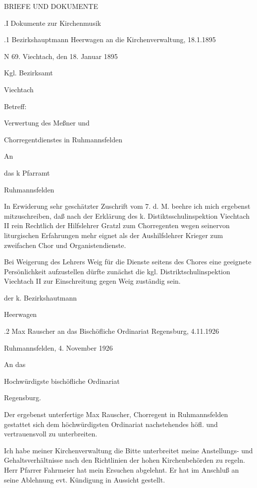 \documentclass[12pt,a4paper]{book}
\begin{document}
BRIEFE UND DOKUMENTE

.I Dokumente zur Kirchenmusik

.1 Bezirkshauptmann Heerwagen an die Kirchenverwaltung, 18.1.1895

N 69.               Viechtach, den 18. Januar 1895



Kgl. Bezirksamt

Viechtach



Betreff:



Verwertung des Meßner und

Chorregentdienstes in Ruhmannsfelden



An

das k Pfarramt

Ruhmannsfelden



In Erwiderung sehr geschätzter Zuschrift vom 7. d. M. beehre ich mich ergebenst
mitzuschreiben, daß nach der Erklärung des k. Distiktsschulinspektion Viechtach
II rein Rechtlich der Hilfslehrer Gratzl zum Chorregenten wegen seinervon
liturgischen Erfahrungen mehr  eignet als der Aushilfslehrer Krieger zum
zweifachen Chor und Organistendienste.

Bei  Weigerung des Lehrers Weig für die Dienste seitens des Chores eine
geeignete Persönlichkeit aufzustellen dürfte zunächst die kgl.
Distriktschulinspektion Viechtach II zur Einschreitung gegen Weig zuständig
sein.



der k. Bezirkshautmann



Heerwagen

.2 Max Rauscher an das Bischöfliche Ordinariat Regensburg, 4.11.1926

Ruhmannsfelden, 4. November 1926

An das

    Hochwürdigste bischöfliche Ordinariat

                    Regensburg.



Der ergebenst unterfertige Max Rauscher, Chorregent in Ruhmannsfelden gestattet
sich dem höchwürdigsten Ordinariat nachstehendes höfl. und vertrauensvoll zu
unterbreiten.

Ich habe meiner Kirchenverwaltung die Bitte unterbreitet meine Anstellungs- und
Gehaltsverhältnisse nach den Richtlinien der hohen Kirchenbehörden zu regeln.
Herr Pfarrer Fahrmeier hat mein Ersuchen abgelehnt. Er hat im Anschluß an seine
Ablehnung evt. Kündigung in Aussicht gestellt.
\end{document}
